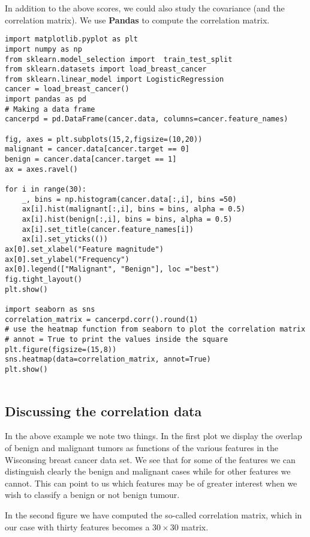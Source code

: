 \documentclass[%
oneside,                 %
final,                   %
10pt]{article}
\begin{document}
In addition to the above scores, we could also study the covariance (and the correlation matrix).
We use \textbf{Pandas} to compute the correlation matrix.
\begin{verbatim}
import matplotlib.pyplot as plt
import numpy as np
from sklearn.model_selection import  train_test_split 
from sklearn.datasets import load_breast_cancer
from sklearn.linear_model import LogisticRegression
cancer = load_breast_cancer()
import pandas as pd
# Making a data frame
cancerpd = pd.DataFrame(cancer.data, columns=cancer.feature_names)

fig, axes = plt.subplots(15,2,figsize=(10,20))
malignant = cancer.data[cancer.target == 0]
benign = cancer.data[cancer.target == 1]
ax = axes.ravel()

for i in range(30):
    _, bins = np.histogram(cancer.data[:,i], bins =50)
    ax[i].hist(malignant[:,i], bins = bins, alpha = 0.5)
    ax[i].hist(benign[:,i], bins = bins, alpha = 0.5)
    ax[i].set_title(cancer.feature_names[i])
    ax[i].set_yticks(())
ax[0].set_xlabel("Feature magnitude")
ax[0].set_ylabel("Frequency")
ax[0].legend(["Malignant", "Benign"], loc ="best")
fig.tight_layout()
plt.show()

import seaborn as sns
correlation_matrix = cancerpd.corr().round(1)
# use the heatmap function from seaborn to plot the correlation matrix
# annot = True to print the values inside the square
plt.figure(figsize=(15,8))
sns.heatmap(data=correlation_matrix, annot=True)
plt.show()


\end{verbatim}

\subsection*{Discussing the correlation data}

In the above example we note two things. In the first plot we display
the overlap of benign and malignant tumors as functions of the various
features in the Wisconsing breast cancer data set. We see that for
some of the features we can distinguish clearly the benign and
malignant cases while for other features we cannot. This can point to
us which features may be of greater interest when we wish to classify
a benign or not benign tumour.

In the second figure we have computed the so-called correlation
matrix, which in our case with thirty features becomes a $30\times 30$
matrix.
\end{document}
